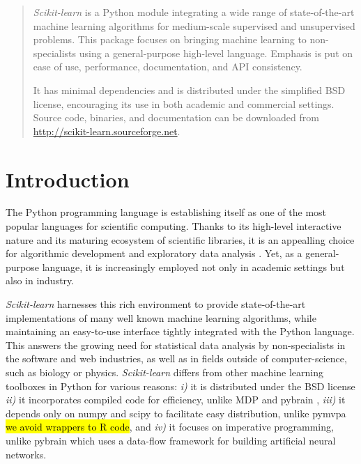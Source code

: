 \documentclass[twoside,11pt]{article}
\begin{document}

\maketitle

\begin{abstract}
%
\emph{Scikit-learn} is a Python module integrating a wide range of
state-of-the-art machine learning algorithms for medium-scale supervised
and unsupervised problems. This package focuses on bringing machine
learning to non-specialists using a general-purpose high-level language.
Emphasis is put on ease of use, performance, documentation, and API
consistency.

%
It has minimal dependencies and is distributed under the simplified BSD
license, encouraging its use in both academic and commercial settings.
Source code, binaries, and documentation can be downloaded from
\url{http://scikit-learn.sourceforge.net}.

\end{abstract}





\section{Introduction}

The Python programming language is establishing itself as one of the
most popular languages for scientific computing. Thanks to its
high-level interactive nature and its maturing ecosystem of scientific
libraries, it is an appealling choice for algorithmic development and
exploratory data analysis \citep{cise2007,cise2011}. Yet, as a
general-purpose language, it is increasingly employed not only in academic
settings but also in industry.

{\sl Scikit-learn} harnesses this rich environment to provide state-of-the-art
implementations of
many well known machine learning algorithms, while maintaining an
easy-to-use interface tightly integrated with the Python language. This answers the
growing need for statistical data analysis by non-specialists in the software and web
industries, as well as in fields outside of computer-science, such as biology or physics.
\emph{Scikit-learn} differs from other machine learning toolboxes in Python for
various reasons: \emph{i)} it is distributed under the BSD license
\emph{ii)} it incorporates compiled code for efficiency, unlike MDP
\citep{zito2008} and pybrain \citep{schaul2010}, \emph{iii)} it depends
only on numpy and scipy to facilitate easy distribution, 
unlike pymvpa \citep{hanke2009} \hl{we avoid wrappers to R code}, and \emph{iv)} it focuses on imperative
programming, unlike pybrain which uses a data-flow framework
for building artificial neural networks.
\end{document}
